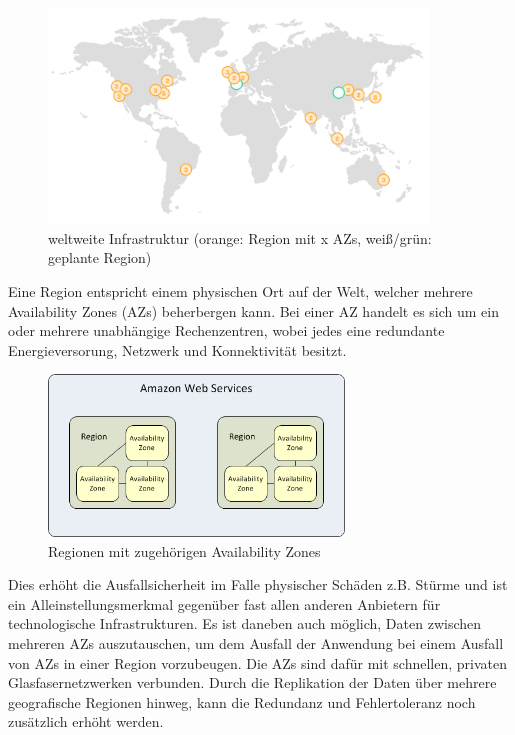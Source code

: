 {\begin{figure}[!ht]
  \centering
  \includegraphics[width=0.9\textwidth]{images/regions.png}
  \caption{weltweite Infrastruktur (orange: Region mit x AZs, weiß/grün: geplante Region) \cite{aws:regions}}
\end{figure}

Eine Region entspricht einem physischen Ort auf der Welt, welcher mehrere Availability Zones (AZs) beherbergen kann. Bei einer AZ handelt es sich um ein oder mehrere unabhängige Rechenzentren, wobei jedes eine redundante Energieversorung, Netzwerk und Konnektivität besitzt.

\begin{figure}[!ht]
  \centering
  \includegraphics[width=0.7\textwidth]{images/azs_regions.png}
  \caption{Regionen mit zugehörigen Availability Zones \cite{aws:azs}}\label{figure:azs-regions}
\end{figure}

Dies erhöht die Ausfallsicherheit im Falle physischer Schäden z.B. Stürme und ist ein Alleinstellungsmerkmal gegenüber fast allen anderen Anbietern für technologische Infrastrukturen. Es ist daneben auch möglich, Daten zwischen mehreren AZs auszutauschen, um dem Ausfall der Anwendung bei einem Ausfall von AZs in einer Region vorzubeugen. Die AZs sind dafür mit schnellen, privaten Glasfasernetzwerken verbunden.
Durch die Replikation der Daten über mehrere geografische Regionen hinweg, kann die Redundanz und Fehlertoleranz noch zusätzlich erhöht werden.

}
